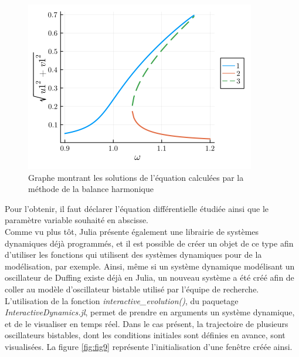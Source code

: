 \documentclass[a4paper, french, 12pt, titlepage]{article}
\begin{document}
\begin{figure}[H]
  \begin{center}
    \includegraphics[width=0.45\linewidth]{harmonicbalance.png}
    \caption{Graphe montrant les solutions de l'équation calculées par la méthode de la balance harmonique}
    \label{fig:fig8}
  \end{center}
\end{figure}

Pour l'obtenir, il faut déclarer l'équation différentielle étudiée ainsi que le paramètre variable souhaité en abscisse.\\

Comme vu plus tôt, Julia présente également une librairie de systèmes dynamiques déjà programmés, et il est possible de créer un objet de ce type afin d'utiliser les fonctions qui utilisent des systèmes dynamiques pour de la modélisation, par exemple.
Ainsi, même si un système dynamique modélisant un oscillateur de Duffing existe déjà en Julia, un nouveau système a été créé afin de coller au modèle d'oscillateur bistable utilisé par l'équipe de recherche. \\

L'utilisation de la fonction \emph{interactive\_evolution()}, du paquetage \emph{InteractiveDynamics.jl}, permet de prendre en arguments un système dynamique, et de le visualiser en temps réel.
Dans le cas présent, la trajectoire de plusieurs oscillateurs bistables, dont les conditions initiales sont définies en avance, sont visualisées.
La figure \ref{fig:fig9} représente l'initialisation d'une fenêtre créée ainsi. \\
\end{document}
